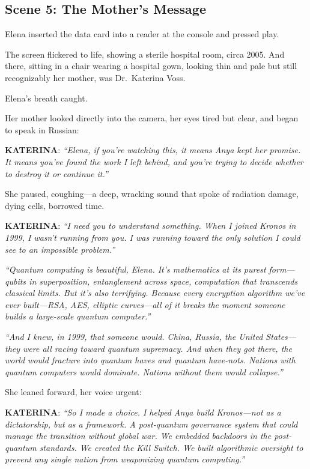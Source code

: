 \hypertarget{scene-5-the-mothers-message}{%
\subsection{Scene 5: The Mother's Message}\label{scene-5-the-mothers-message}}

Elena inserted the data card into a reader at the console and pressed play.

The screen flickered to life, showing a sterile hospital room, circa 2005. And there, sitting in a chair wearing a hospital gown, looking thin and pale but still recognizably her mother, was Dr.~Katerina Voss.

Elena's breath caught.

Her mother looked directly into the camera, her eyes tired but clear, and began to speak in Russian:

\textbf{KATERINA}: \emph{``Elena, if you're watching this, it means Anya kept her promise. It means you've found the work I left behind, and you're trying to decide whether to destroy it or continue it.''}

She paused, coughing---a deep, wracking sound that spoke of radiation damage, dying cells, borrowed time.

\textbf{KATERINA}: \emph{``I need you to understand something. When I joined Kronos in 1999, I wasn't running from you. I was running toward the only solution I could see to an impossible problem.''}

\emph{``Quantum computing is beautiful, Elena. It's mathematics at its purest form---qubits in superposition, entanglement across space, computation that transcends classical limits. But it's also terrifying. Because every encryption algorithm we've ever built---RSA, AES, elliptic curves---all of it breaks the moment someone builds a large-scale quantum computer.''}

\emph{``And I knew, in 1999, that someone would. China, Russia, the United States---they were all racing toward quantum supremacy. And when they got there, the world would fracture into quantum haves and quantum have-nots. Nations with quantum computers would dominate. Nations without them would collapse.''}

She leaned forward, her voice urgent:

\textbf{KATERINA}: \emph{``So I made a choice. I helped Anya build Kronos---not as a dictatorship, but as a framework. A post-quantum governance system that could manage the transition without global war. We embedded backdoors in the post-quantum standards. We created the Kill Switch. We built algorithmic oversight to prevent any single nation from weaponizing quantum computing.''}

